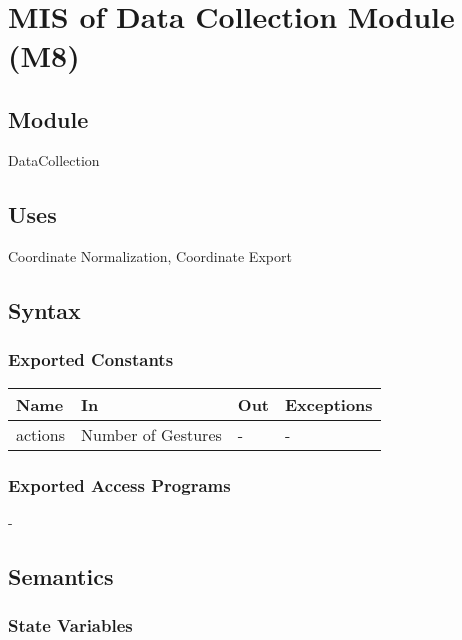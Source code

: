 \documentclass[12pt, titlepage]{article}
\begin{document}
~\newpage

\section{MIS of Data Collection Module (M8)} \label{M9}

\subsection{Module}

DataCollection\\

\subsection{Uses}

Coordinate Normalization, Coordinate Export\\

\subsection{Syntax}

\subsubsection{Exported Constants}

\begin{center}
\begin{tabular}{p{5cm} p{3cm} p{3cm} p{4cm}}
\hline
\textbf{Name} & \textbf{In} & \textbf{Out} & \textbf{Exceptions} \\
\hline
actions & Number of Gestures & - & - \\
\hline
\end{tabular}
\end{center}

\subsubsection{Exported Access Programs}
-

\subsection{Semantics}

\subsubsection{State Variables}
\end{document}
